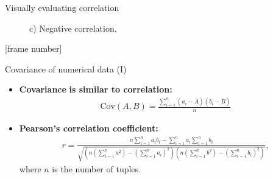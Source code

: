\documentclass[aspectratio=169,t]{beamer}
\begin{document}
{\begin{frame}{Visually evaluating correlation}
\begin{figure}[H]
\begin{minipage}{0.32\textwidth}
            \caption{c) Negative correlation.}
        \end{minipage}\hfill
    \end{figure}
    \end{frame}
  }

  {
    [frame number]
    \begin{frame}{Covariance of numerical data (I)}
    \begin{itemize}
      \item \textbf{\color{airforceblue}Covariance} \textbf{is similar to correlation:}\\
            \begin{align}
              \text{Cov}(A,B) = \frac{\sum_{i=1}^{n}(a_i-\overline{A})(b_i-\overline{B})}{n}
            \end{align}
      \item \textbf{Pearson's correlation coefficient:}\\
            \begin{align}
              r = \frac{n \sum_{i=1}^{n}a_ib_i - \sum_{i=1}^{n}a_i \sum_{i=1}^{n}b_i}{\sqrt{\left(n \left(\sum_{i=1}^{n} a^2\right) - \left(\sum_{i=1}^{n} a_i\right)^2\right) \left(n \left(\sum_{i=1}^{n}b^2\right) - \left(\sum_{i=1}^{n}b_i\right)^2\right)}},
            \end{align}
            where $n$ is the number of tuples.
    \end{itemize}
    \end{frame}
  }
\end{document}
